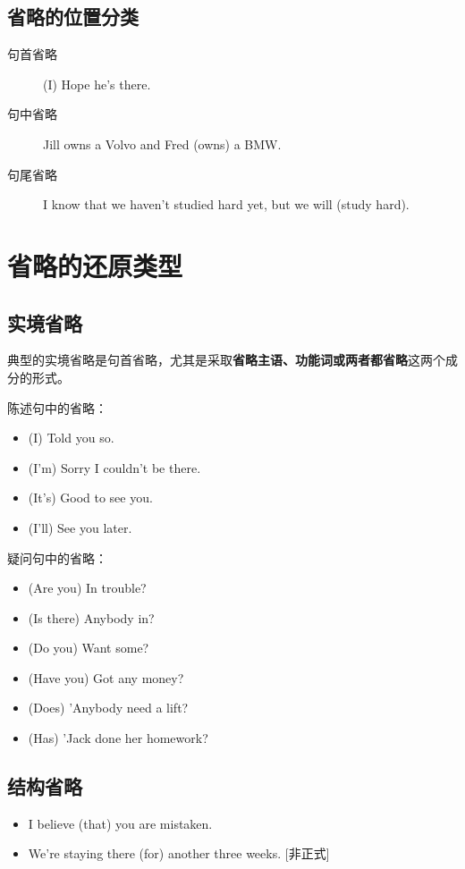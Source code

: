\subsection{省略的位置分类}

\begin{description}
\item[句首省略] (I) Hope he's there.
\item[句中省略] Jill owns a Volvo and Fred (owns) a BMW.
\item[句尾省略] I know that we haven't studied hard yet, but we will (study hard).
\end{description}

\section{省略的还原类型}

\subsection{实境省略}

典型的实境省略是句首省略，尤其是采取\textbf{省略主语、功能词或两者都省略}这两个成
分的形式。

陈述句中的省略：
\begin{itemize}
\item (I) Told you so.
\item (I'm) Sorry I couldn't be there.
\item (It's) Good to see you.
\item (I'll) See you later.
\end{itemize}

疑问句中的省略：
\begin{itemize}
\item (Are you) In trouble?
\item (Is there) Anybody in?
\item (Do you) Want some?
\item (Have you) Got any money?
\item (Does) 'Anybody need a lift?
\item (Has) 'Jack done her homework?
\end{itemize}

\subsection{结构省略}

\begin{itemize}
\item I believe (that) you are mistaken.
\item We're staying there (for) another three weeks. [非正式]
\end{itemize}

